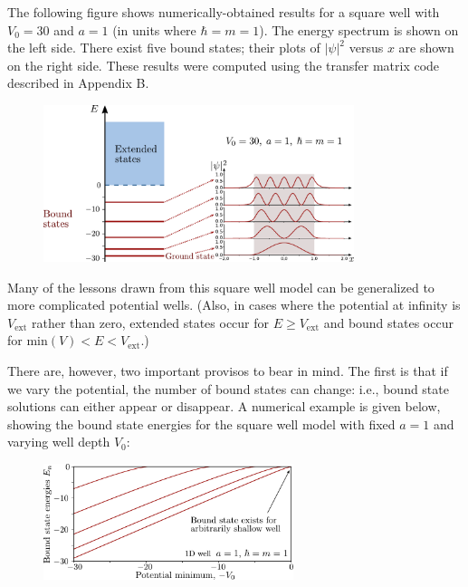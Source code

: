 \documentclass[pra,12pt]{revtex4}
\begin{document}
The following figure shows numerically-obtained results for a square
well with $V_0 = 30$ and $a=1$ (in units where $\hbar = m =1$).  The
energy spectrum is shown on the left side.  There exist five bound
states; their plots of $|\psi|^2$ versus $x$ are shown on the right
side.  These results were computed using the transfer matrix code
described in Appendix B.

\begin{figure}[h]
  \centering\includegraphics[width=0.81\textwidth]{boundvsextended}
\end{figure}


Many of the lessons drawn from this square well model can be
generalized to more complicated potential wells.  (Also, in cases
where the potential at infinity is $V_{\textrm{ext}}$ rather than
zero, extended states occur for $E \ge V_{\textrm{ext}}$ and bound
states occur for $\textrm{min}(V) < E < V_{\textrm{ext}}$.)

There are, however, two important provisos to bear in mind.  The first
is that if we vary the potential, the number of bound states can
change: i.e., bound state solutions can either appear or disappear.  A
numerical example is given below, showing the bound state energies for
the square well model with fixed $a = 1$ and varying well depth $V_0$:

\begin{figure}[h]
  \centering\includegraphics[width=0.65\textwidth]{boundstate1d}
\end{figure}
\end{document}
